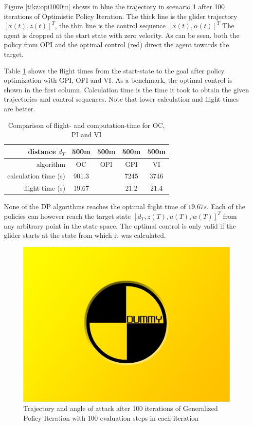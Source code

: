 Figure \ref{tikz:opi1000m} shows in blue the trajectory in scenario 1 after 100 iterations of Optimistic Policy Iteration. The thick line is the glider trajectory $[x(t),z(t)]^T$, the thin line is the control sequence $[x(t),\alpha(t)]^T$ The agent is dropped at the start state with zero velocity. As can be seen, both the policy from OPI and the optimal control (red) direct the agent towards the target.

Table \ref{tab:2d_flighttimes} shows the flight times from the start-state to the goal after policy optimization with GPI, OPI and VI. As a benchmark, the optimal control  is shown in the first column. Calculation time is the time it took to obtain the given trajectories and control sequences. Note that lower calculation and flight times are better.

\begin{table}[h]
	\begin{center}
		\begin{tabular}{r|c c c c}
			distance $d_T$ & 500m & 500m & 500m & 500m \\ \hline 
			algorithm & OC & OPI & GPI & VI \\
			calculation time (s) & 901.3 & & 7245 & 3746 \\
			flight time (s) & 19.67 & & 21.2 & 21.4
		\end{tabular}
		\caption{Comparison of flight- and computation-time for OC, PI and VI}
		\label{tab:2d_flighttimes}
	\end{center}
\end{table}

None of the DP algorithms reaches the optimal flight time of $19.67s$. Each of the policies can however reach the target state $[d_T,z(T),u(T),w(T)]^T$ from any arbitrary point in the state space. The optimal control is only valid if the glider starts at the state from which it was calculated.

\begin{figure}[h]
	\includegraphics[width=\textwidth]{src/pics/dummy.jpg}
	\caption{Trajectory and angle of attack after 100 iterations of Generalized Policy Iteration with 100 evaluation steps in each iteration}
	\label{fig:2d_flighttimes_GPI_OPI}
\end{figure}

